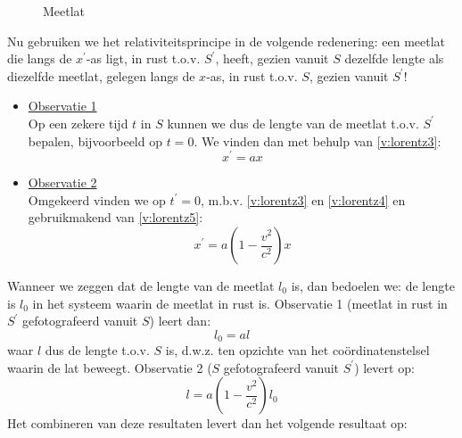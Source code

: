 
\begin{figure}[ht]
\centering
{}
\caption{Meetlat}
\label{f:lorentz2}
\end{figure}


Nu gebruiken we het relativiteitsprincipe in de volgende redenering: 
een meetlat die langs de $x^{'}$-as ligt, in rust t.o.v. $S^{'}$, 
heeft, gezien vanuit $S$ dezelfde lengte als diezelfde meetlat, gelegen 
langs de $x$-as, in rust t.o.v. $S$, gezien vanuit $S^{'}$!
\begin{itemize}
\item \underline{Observatie 1} \\
Op een zekere tijd $t$ in $S$ kunnen we dus de lengte van de meetlat 
t.o.v. $S^{'}$ bepalen, bijvoorbeeld op \underline{$t = 0$}.
We vinden dan met behulp van \ref{v:lorentz3}:
\begin{displaymath}
x^{'} = ax
\end{displaymath}
\item \underline{Observatie 2} \\
Omgekeerd vinden we op \underline{$t^{'} = 0$}, m.b.v. \ref{v:lorentz3} en 
\ref{v:lorentz4} en gebruikmakend van \ref{v:lorentz5}:
\begin{displaymath}
x^{'} = a(1 - \frac{v^{2}}{c^{2}})x
\end{displaymath}
\end{itemize}
Wanneer we zeggen dat de lengte van de meetlat $l_0$ is, dan bedoelen we: 
de lengte is $l_{0}$ in het systeem waarin de meetlat in rust is.
Observatie 1 (meetlat in rust in  $S^{'}$ gefotografeerd vanuit $S$) leert dan:
\begin{displaymath}
l_{0} = al
\end{displaymath}
waar $l$ dus de lengte t.o.v. $S$ is, d.w.z. ten opzichte van het 
co\"{o}rdinatenstelsel waarin de lat beweegt.
Observatie 2 ($S$ gefotografeerd vanuit $S^{'}$) levert op:
\begin{displaymath}
l = a(1-\frac{v^{2}}{c^{2}})l_{0}
\end{displaymath}
Het combineren van deze resultaten levert dan het volgende resultaat op:
